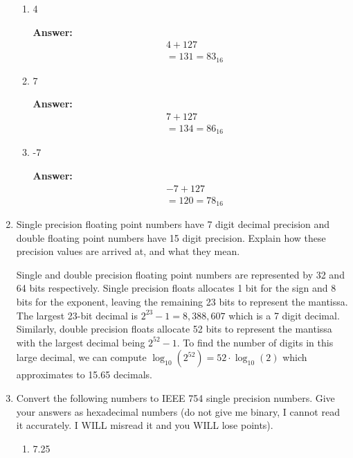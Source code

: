\documentclass[12pt]{article}
\begin{document}
\begin{enumerate}
\begin{enumerate}
      \item 4

      \textbf{Answer:}
      \begin{align*}
        &4 + 127 \\
        &= 131 = 83_{16}
      \end{align*}

      \setcounter{enumii}{3}
      \item 7

      \textbf{Answer:}
      \begin{align*}
        &7 + 127 \\
        &= 134 = 86_{16}
      \end{align*}

      \item -7

      \textbf{Answer:}
      \begin{align*}
        &-7 + 127 \\
        &= 120 = 78_{16}
      \end{align*}

    \end{enumerate}

    \setcounter{enumi}{7}
    \item Single precision floating point numbers have 7 digit decimal precision and double floating point numbers have 15 digit precision. Explain how these precision values are arrived at, and what they mean.

    Single and double precision floating point numbers are represented by 32 and 64 bits respectively. Single precision floats allocates 1 bit for the sign and 8 bits for the exponent, leaving the remaining 23 bits to represent the mantissa. The largest 23-bit decimal is $2^{23}-1=8,388,607$ which is a 7 digit decimal. Similarly, double precision floats allocate 52 bits to represent the mantissa with the largest decimal being $2^{52}-1$. To find the number of digits in this large decimal, we can compute $\log_{10}(2^{52})=52\cdot \log_{10}(2)$ which approximates to 15.65 decimals.

    \item Convert the following numbers to IEEE 754 single precision numbers. Give your answers as hexadecimal numbers (do not give me binary, I cannot read it accurately. I WILL misread it and you WILL lose points).
    \begin{enumerate}
      \item 7.25


\end{enumerate}
\end{enumerate}
\end{document}

